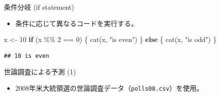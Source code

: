 \documentclass[
  ignorenonframetext,
]{beamer}
\newenvironment{Shaded}{\begin{snugshade}}{\end{snugshade}}
\newcommand{\CommentTok}[1]{\textcolor[rgb]{0.56,0.35,0.01}{\textit{#1}}}
\newcommand{\ControlFlowTok}[1]{\textcolor[rgb]{0.13,0.29,0.53}{\textbf{#1}}}
\newcommand{\DecValTok}[1]{\textcolor[rgb]{0.00,0.00,0.81}{#1}}
\newcommand{\FunctionTok}[1]{\textcolor[rgb]{0.00,0.00,0.00}{#1}}
\newcommand{\NormalTok}[1]{#1}
\newcommand{\OtherTok}[1]{\textcolor[rgb]{0.56,0.35,0.01}{#1}}
\newcommand{\SpecialCharTok}[1]{\textcolor[rgb]{0.00,0.00,0.00}{#1}}
\newcommand{\StringTok}[1]{\textcolor[rgb]{0.31,0.60,0.02}{#1}}
\providecommand{\tightlist}{%
  \setlength{\itemsep}{0pt}\setlength{\parskip}{0pt}}
\begin{document}
\begin{frame}[fragile]{条件分岐 (if statement)}
\protect\hypertarget{ux6761ux4ef6ux5206ux5c90-if-statement}{}
\begin{itemize}
\tightlist
\item
  条件に応じて異なるコードを実行する。
\end{itemize}

\scriptsize

\begin{Shaded}
\begin{Highlighting}[]
\NormalTok{x }\OtherTok{\textless{}{-}} \DecValTok{10}
\ControlFlowTok{if}\NormalTok{ (x }\SpecialCharTok{\%\%} \DecValTok{2} \SpecialCharTok{==} \DecValTok{0}\NormalTok{) \{}
    \FunctionTok{cat}\NormalTok{(x, }\StringTok{"is even"}\NormalTok{)}
\NormalTok{\} }\ControlFlowTok{else}\NormalTok{ \{}
    \FunctionTok{cat}\NormalTok{(x, }\StringTok{"is odd"}\NormalTok{)}
\NormalTok{\}}
\end{Highlighting}
\end{Shaded}

\begin{verbatim}
## 10 is even
\end{verbatim}

\normalsize
\end{frame}

\begin{frame}[fragile]{世論調査による予測 (1)}
\protect\hypertarget{ux4e16ux8ad6ux8abfux67fbux306bux3088ux308bux4e88ux6e2c-1}{}
\begin{itemize}
\tightlist
\item
  2008年米大統領選の世論調査データ（\texttt{polls08.csv}）を使用。
\end{itemize}

\scriptsize

\begin{Shaded}
\end{Shaded}

\normalsize
\end{frame}
\end{document}
